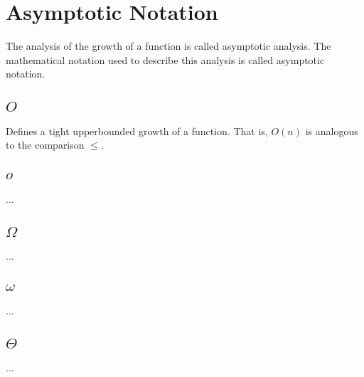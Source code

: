 
\thispagestyle{fancyplain}

\chapter{Asymptotic Notation}
\label{ch:asymptoticnotation}
The analysis of the growth of a function is called asymptotic analysis. The
mathematical notation used to describe this analysis is called asymptotic
notation.

\section{$O$}
\label{ch:asymptoticnotation|sec:big-o}
Defines a tight upperbounded growth of a function. That is, $O(n)$ is
analogous to the comparison $\leq$.

\section{$o$}
\label{ch:asymptoticnotation|sec:little-o}
...

\section{$\Omega$}
\label{ch:asymptoticnotation|sec:big-omega}
...

\section{$\omega$}
\label{ch:asymptoticnotation|sec:litte-omega}
...

\section{$\Theta$}
\label{ch:asymptoticnotation|sec:theta}
...

